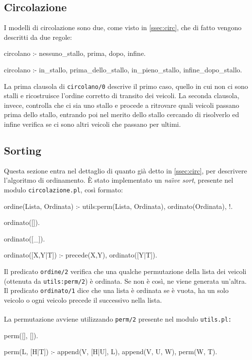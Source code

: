 \subsection{Circolazione}
I modelli di circolazione sono due, come visto in \ref{ssec:circ}, che di fatto vengono descritti da due regole:

\begin{verbatimtab}
circolano :-
	nessuno_stallo,
	prima,
	dopo,
	infine.

circolano :-
	in_stallo,
	prima_dello_stallo,
	in_pieno_stallo,
	infine_dopo_stallo.
\end{verbatimtab}

La prima clausola di \texttt{circolano/0} descrive il primo caso, quello in cui non ci sono stalli e ricostruisce l'ordine corretto di transito dei veicoli. La seconda clausola, invece, controlla che ci sia uno stallo e procede a ritrovare quali veicoli passano prima dello stallo, entrando poi nel merito dello stallo cercando di risolverlo ed infine verifica se ci sono altri veicoli che passano per ultimi.

\subsection{Sorting}
Questa sezione entra nel dettaglio di quanto già detto in \ref{ssec:circ}, per descrivere l'algoritmo di ordinamento. È stato implementato un \emph{na\"{\i}ve sort}\cite{Clocksin:2003}, presente nel modulo \texttt{circolazione.pl}, così formato:
\begin{verbatimtab}
ordine(Lista, Ordinata) :-
	utils:perm(Lista, Ordinata),
	ordinato(Ordinata),
	!.

ordinato([]).

ordinato([_]).

ordinato([X,Y|T]) :-
	precede(X,Y),
	ordinato([Y|T]).
\end{verbatimtab}

Il predicato \texttt{ordine/2} verifica che una qualche permutazione della lista dei veicoli (ottenuta da \texttt{utils:perm/2}) è ordinata. Se non è così, ne viene generata un'altra. Il predicato \texttt{ordinato/1} dice che una lista è ordinata se è vuota, ha un solo veicolo o ogni veicolo precede il successivo nella lista.
\\\\
La permutazione avviene utilizzando \texttt{perm/2} presente nel modulo \texttt{utils.pl:}
\begin{verbatimtab}
perm([], []).
	
perm(L, [H|T]) :-
	append(V, [H|U], L),
	append(V, U, W),
	perm(W, T).
\end{verbatimtab}

